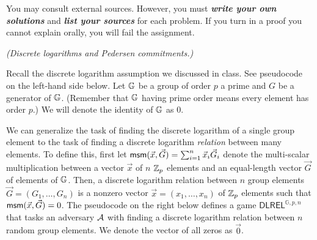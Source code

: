 \medskip
\noindent You may consult external sources.  However, you must \textbf{\emph{write your own solutions}} and \textbf{\emph{list your sources}} for each problem. If you turn in a proof you cannot explain orally, you will fail the assignment.


\begin{questions}
\question \emph{(Discrete logarithms and Pedersen commitments.)} 

  Recall the discrete logarithm assumption we discussed in class. See pseudocode on the left-hand side below. Let $\mathbb{G}$ be a group of order $p$ a prime and $G$ be a generator of $\mathbb{G}$. (Remember that $\mathbb{G}$ having prime order means every element has order $p$.) We will denote the identity of $\mathbb{G}$ as $0$.


  We can generalize the task of finding the discrete logarithm of a single group element to the task of finding a discrete logarithm \emph{relation} between 
  many elements. To define this, first let $\mathsf{msm}(\vec{x}, \vec{G}) = \sum_{i=1}^n \vec{x}_i \vec{G}_i$ denote the multi-scalar multiplication between a vector $\vec{x}$ of $n$ $\mathbb{Z}_p$ elements and an equal-length vector $\vec{G}$ of elements of $\mathbb{G}$. Then, a discrete logarithm relation between $n$ group elements $\vec{G} = (G_1, \ldots, G_n)$ is a nonzero vector $\vec{x} = (x_1, \ldots, x_n)$ of $\mathbb{Z}_p$ elements such that $\mathsf{msm}(\vec{x}, \vec{G}) = 0$. The pseudocode on the right below  defines a game $\mathsf{DLREL}^{\mathbb{G},p, n}$ that tasks an adversary $\mathcal{A}$ with finding a discrete logarithm relation between $n$ random group elements. We denote the vector of all zeros as $\vec{0}$.

  \begin{figure}[h]
    \centering
    \label{fig:dlgame}
  \end{figure}


\end{questions}
